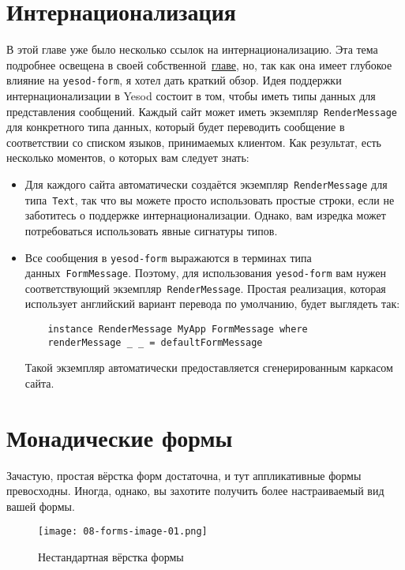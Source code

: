 \section{Интернационализация}
В этой главе уже было несколько ссылок на интернационализацию. Эта тема
подробнее освещена в своей собственной~\hyperref[chap:i18n]{главе}, но, так как
она имеет глубокое влияние на \lstinline'yesod-form', я хотел дать краткий обзор.
Идея поддержки интернационализации в Yesod состоит в том, чтобы иметь
типы данных для представления сообщений. Каждый сайт может иметь
экземпляр~\lstinline'RenderMessage' для конкретного типа данных, который будет
переводить сообщение в соответствии со списком языков, принимаемых клиентом.
Как результат, есть несколько моментов, о которых вам следует знать:
\begin{itemize}
    \item  Для каждого сайта автоматически создаётся
        экземпляр~\lstinline'RenderMessage' для типа~\lstinline'Text', так что
        вы можете просто использовать простые строки, если не заботитесь о
        поддержке интернационализации. Однако, вам изредка может потребоваться
        использовать явные сигнатуры типов.

    \item Все сообщения в \lstinline'yesod-form' выражаются в терминах типа
        данных~\lstinline'FormMessage'.  Поэтому, для использования \lstinline'yesod-form'
        вам нужен соответствующий экземпляр~\lstinline'RenderMessage'. Простая
        реализация, которая использует английский вариант перевода по
        умолчанию, будет выглядеть так:
\begin{lstlisting}
    instance RenderMessage MyApp FormMessage where
    renderMessage _ _ = defaultFormMessage
\end{lstlisting}
        Такой экземпляр автоматически предоставляется сгенерированным каркасом
        сайта.
\end{itemize}

\section{Монадические формы}
Зачастую, простая вёрстка форм достаточна, и тут аппликативные формы
превосходны. Иногда, однако, вы захотите получить более настраиваемый вид вашей
формы.
\begin{figure}[tbph]
  \centering
  \texttt{[image: 08-forms-image-01.png]}
  \caption{Нестандартная вёрстка формы}
\end{figure}


